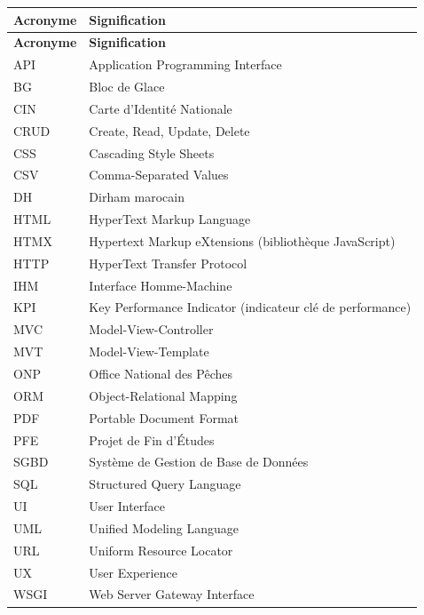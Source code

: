 \begin{longtable}{@{}p{3cm}p{11cm}@{}}
\textbf{Acronyme} & \textbf{Signification} \\
\midrule
\endfirsthead

\textbf{Acronyme} & \textbf{Signification} \\
\midrule
\endhead

API & Application Programming Interface \\
BG & Bloc de Glace \\
CIN & Carte d'Identité Nationale \\
CRUD & Create, Read, Update, Delete \\
CSS & Cascading Style Sheets \\
CSV & Comma-Separated Values \\
DH & Dirham marocain \\
HTML & HyperText Markup Language \\
HTMX & Hypertext Markup eXtensions (bibliothèque JavaScript) \\
HTTP & HyperText Transfer Protocol \\
IHM & Interface Homme-Machine \\
KPI & Key Performance Indicator (indicateur clé de performance) \\
MVC & Model-View-Controller \\
MVT & Model-View-Template \\
ONP & Office National des Pêches \\
ORM & Object-Relational Mapping \\
PDF & Portable Document Format \\
PFE & Projet de Fin d'Études \\
SGBD & Système de Gestion de Base de Données \\
SQL & Structured Query Language \\
UI & User Interface \\
UML & Unified Modeling Language \\
URL & Uniform Resource Locator \\
UX & User Experience \\
WSGI & Web Server Gateway Interface \\
\end{longtable}
